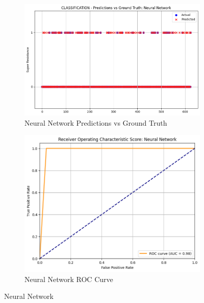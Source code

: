 \documentclass[manuscript,screen,review, nonacm]{acmart}
\begin{document}
\begin{figure}[H]
    \centering
    \begin{subfigure}{0.45\textwidth}
        \includegraphics[width=\linewidth]{figs/nn1.png}
        \caption{Neural Network Predictions vs Ground Truth}
    \end{subfigure}
    \hfill
    \begin{subfigure}{0.45\textwidth}
        \includegraphics[width=\linewidth]{figs/nn2.png}
        \caption{Neural Network ROC Curve}
    \end{subfigure}
    \caption{Neural Network}
\end{figure}
\end{document}
